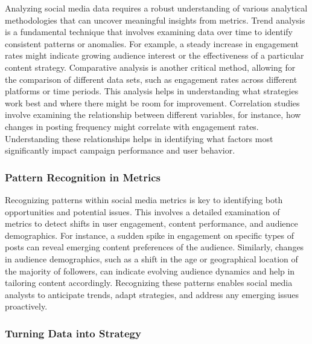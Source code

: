 \documentclass[
]{book}
\begin{document}
Analyzing social media data requires a robust understanding of various analytical methodologies that can uncover meaningful insights from metrics. Trend analysis is a fundamental technique that involves examining data over time to identify consistent patterns or anomalies. For example, a steady increase in engagement rates might indicate growing audience interest or the effectiveness of a particular content strategy. Comparative analysis is another critical method, allowing for the comparison of different data sets, such as engagement rates across different platforms or time periods. This analysis helps in understanding what strategies work best and where there might be room for improvement. Correlation studies involve examining the relationship between different variables, for instance, how changes in posting frequency might correlate with engagement rates. Understanding these relationships helps in identifying what factors most significantly impact campaign performance and user behavior.

\hypertarget{pattern-recognition-in-metrics}{%
\subsubsection*{Pattern Recognition in Metrics}\label{pattern-recognition-in-metrics}}

Recognizing patterns within social media metrics is key to identifying both opportunities and potential issues. This involves a detailed examination of metrics to detect shifts in user engagement, content performance, and audience demographics. For instance, a sudden spike in engagement on specific types of posts can reveal emerging content preferences of the audience. Similarly, changes in audience demographics, such as a shift in the age or geographical location of the majority of followers, can indicate evolving audience dynamics and help in tailoring content accordingly. Recognizing these patterns enables social media analysts to anticipate trends, adapt strategies, and address any emerging issues proactively.

\hypertarget{turning-data-into-strategy}{%
\subsubsection*{Turning Data into Strategy}\label{turning-data-into-strategy}}
\end{document}
